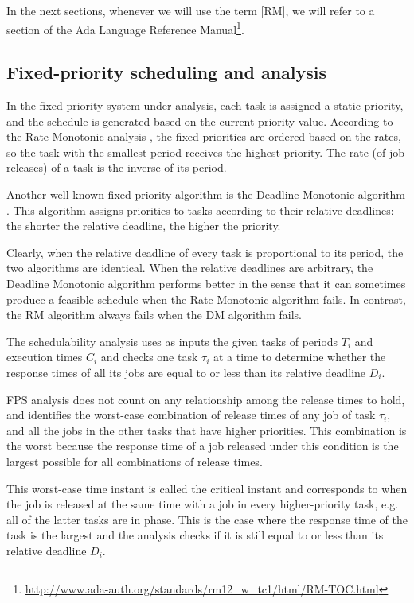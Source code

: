 \documentclass{article}
\begin{document}
In the next sections, whenever we will use the term [RM], we will refer to a section of the Ada Language Reference Manual\footnote{\url{http://www.ada-auth.org/standards/rm12_w_tc1/html/RM-TOC.html}}.

\subsection{Fixed-priority scheduling and analysis}

In the fixed priority system under analysis, each task is assigned a static priority, and the schedule is generated based on the current priority value. According to the Rate Monotonic analysis \cite{rm-dm}, the fixed priorities are ordered based on the rates, so the task with the smallest period receives the highest priority. The rate (of job releases) of a task is the inverse of its period.

Another well-known fixed-priority algorithm is the Deadline Monotonic algorithm \cite{rm-dm}. This algorithm assigns priorities to tasks according to their relative deadlines: the shorter the relative deadline, the higher the priority.

Clearly, when the relative deadline of every task is proportional to its period, the two algorithms are identical. When the relative deadlines are arbitrary, the Deadline Monotonic algorithm performs better in the sense that it can sometimes produce a feasible schedule when the Rate Monotonic algorithm fails. In contrast, the RM algorithm always fails when the DM algorithm fails.

The schedulability analysis uses as inputs the given tasks of periods $T_i$ and execution times $C_i$  and checks one task $\tau_i$ at a time to determine whether the response times of all its jobs are equal to or less than its relative deadline $D_i$.

FPS analysis does not count on any relationship among the release times to hold, and identifies the worst-case combination of release times of any job  of task $\tau_i$, and all the jobs in the other tasks that have higher priorities. This combination is the worst because the response time of a job released under this condition is the largest possible for all combinations of release times.

This worst-case time instant is called the critical instant and corresponds to when the job is released at the same time with a job in every higher-priority task, e.g. all of the latter tasks are in phase. This is the case where the response time of the task is the largest and the analysis checks if it is still equal to or less than its relative deadline $D_i$.
\end{document}
